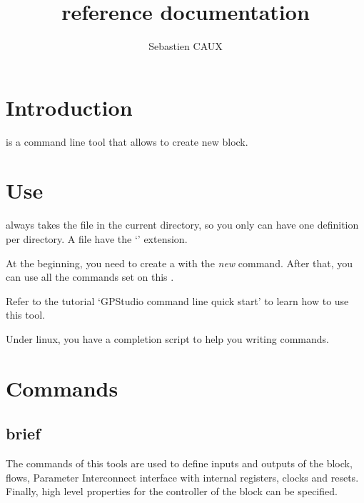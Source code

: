 \documentclass[10pt,a4paper]{article}
\author{Sebastien CAUX}
\title{\tool{} reference documentation \version \\ \gpprocdevice{(since v0.95)} \gpcomp{since v1.02}}
\begin{document}
\maketitle
\section{Introduction}
\tool{} is a command line tool that allows to create new \kind{} block.

\section{Use}
\tool{} always takes the \kind{} file in the current directory, so you only can have one \kind{} definition per directory. A \kind{} file have the `\ext{}' extension.

At the beginning, you need to create a \kind{} with the \emph{new} command. After that, you can use all the commands set on this \kind{}.

Refer to the tutorial `GPStudio command line quick start' to learn how to use this tool.

Under linux, you have a completion script to help you writing commands.

\section{Commands}
\subsection{brief}
The commands of this tools are used to define inputs and outputs of the block, flows, Parameter Interconnect interface with internal registers, clocks and resets. Finally, high level properties for the controller of the block can be specified.
\end{document}
